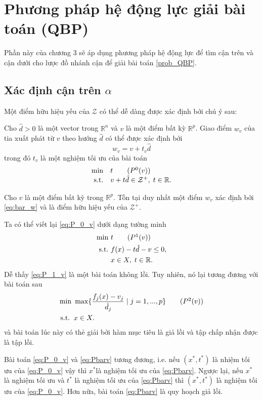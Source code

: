 \section{Phương pháp hệ động lực giải bài toán (QBP)}
Phần này của chương 3 sẽ áp dụng phương pháp hệ động lực để tìm cận trên và cận dưới cho lược đồ nhánh cận để giải bài toán \eqref{prob_QBP}.
\subsection{Xác định cận trên $\alpha$}
Một điểm hữu hiệu yếu của $\mathcal{Z}$ có thể dễ dàng được xác định bởi chú ý sau:\\
\begin{cy}\label{remark:P_0_v}Cho $\hat{d}>0$ là một vector trong
$\mathbb{R}^{n}$ và $v$ là một điểm bất kỳ $\mathbb{R}^{p}$.
Giao điểm $w_{v}$ của tia xuất phát từ $v$ theo hướng
$\hat{d}$ có thể được xác định bởi
\begin{equation} \label{eq:bar_w}
    w_{v}=v+t_{v}\hat{d}
\end{equation} 
trong đó $t_{v}$
là một nghiệm tối ưu của bài toán
\begin{equation}
\begin{array}{rl}
\min & t\tag*{\ensuremath{(P^{0}(v))}}\\
{\rm s.t.} & v+t\hat{d}\in\mathcal{Z}^{+},\;t\in\mathbb{R}.
\end{array}\label{eq:P_0_v}
\end{equation}
\end{cy}

\begin{bd} \label{lem_bar_w} 
    Cho $v$ là một điểm bất kỳ trong $\mathbb{R}^{p}$.
    Tồn tại duy nhất một điểm $w_{v}$ xác định bởi \eqref{eq:bar_w}
    và là điểm hữu hiệu yếu của $\mathcal{Z}^{+}$.  
\end{bd}

Ta có thể viết lại \ref{eq:P_0_v} dưới dạng tường minh
\begin{align}
\min\,\, & t\tag*{\ensuremath{(P^{1}(v))}}\label{eq:P_1_v}\\
\mbox{s.t.\,\,} & f(x)-t\hat{d}-v\leq0,\nonumber \\
 & x\in X,\;t\in\mathbb{R}.\nonumber 
\end{align}
Dễ thấy \ref{eq:P_1_v} là một bài toán không lồi. Tuy nhiên, nó lại tương đương với bài toán sau
\begin{align}
\min\,\, & \max\{\dfrac{f_{j}(x)-v_{j}}{\hat{d}_{j}}\mid j=1,...,p\}\tag*{\ensuremath{(P^{2}(v))}}\label{eq:Pbarv}\\
\mbox{s.t.}\;\; & x\in X.\nonumber 
\end{align}
và bài toán lúc này có thẻ giải bởi hàm mục tiêu là giả lồi và tập chấp nhận được là tập lồi.
\begin{bd}\cite{Thang2020}\label{lem_equiv} 
    Bài toán \ref{eq:P_0_v} và \ref{eq:Pbarv}
    tương đương, i.e. nếu $(x^{*},t^{*})$ là nhiệm tối ưu của
    \ref{eq:P_0_v} vậy thì $x^{*}$là nghiệm tối ưu của \ref{eq:Pbarv}.
    Ngược lại, nếu $x^{*}$ là nghiệm tối ưu và $t^{*}$ là nghiệm tối ưu của \ref{eq:Pbarv} thì $(x^{*},t^{*})$ là nghiệm tối ưu của \ref{eq:P_0_v}. Hơn nữa, bài toán \ref{eq:Pbarv} là quy hoạch giả lồi.
\end{bd}

